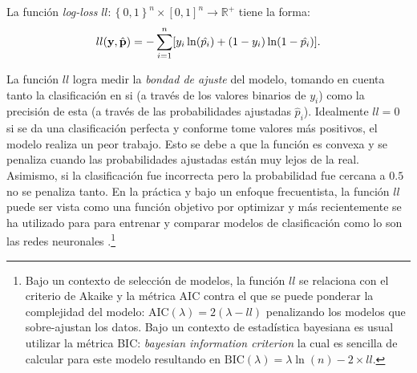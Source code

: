\documentclass[../Main/Main.tex]{subfiles}
\begin{document}
\begin{definition}
La función \textit{log-loss} $ll:\left\{0,1\right\}^n\times[0,1]^n\rightarrow \mathbb{R}^+$ tiene la forma:
\begin{align}
	ll(\mathbf{y},\hat{\mathbf{p}}) = -\sum_{i = 1}^n[ y_i \ln(\hat{p_i}) + (1-y_i)\ln(1-\hat{p_i})]. \label{ec:LogLoss}
\end{align}
\end{definition}
La función $ll$ logra medir la \textit{bondad de ajuste} del modelo, tomando en cuenta tanto la clasificación en si (a través de los valores binarios de $y_i$) como la precisión de esta (a través de las probabilidades ajustadas $\hat{p}_i$).  Idealmente $ll = 0$ si se da una clasificación perfecta y conforme tome valores más positivos, el modelo realiza un peor trabajo. Esto se debe a que la función es convexa y se penaliza cuando las probabilidades ajustadas están muy lejos de la real. Asimismo, si la clasificación fue incorrecta pero la probabilidad fue cercana a $0.5$ no se penaliza tanto.  En la práctica y bajo un enfoque frecuentista, la función $ll$ puede ser vista como una función objetivo por optimizar y más recientemente se ha utilizado para para entrenar y comparar modelos de clasificación como lo son las redes neuronales \autocite{nielsen2015neural}.\footnote{Bajo un contexto de selección de modelos, la función $ll$ se relaciona con el criterio de Akaike y la métrica AIC contra el que se puede ponderar la complejidad del modelo: $\text{AIC}(\lambda) = 2(\lambda - ll)$ penalizando los modelos que sobre-ajustan los datos. Bajo un contexto de estadística bayesiana es usual utilizar la métrica BIC: \textit{bayesian information criterion} la cual es sencilla de calcular para este modelo resultando en $\text{BIC}(\lambda) = \lambda\ln(n) - 2\times ll$. }
\end{document}
